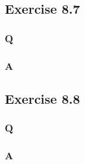 \subsection{Exercise 8.7}
\subsubsection*{Q}
\subsubsection*{A}

\subsection{Exercise 8.8}
\subsubsection*{Q}
\subsubsection*{A}
